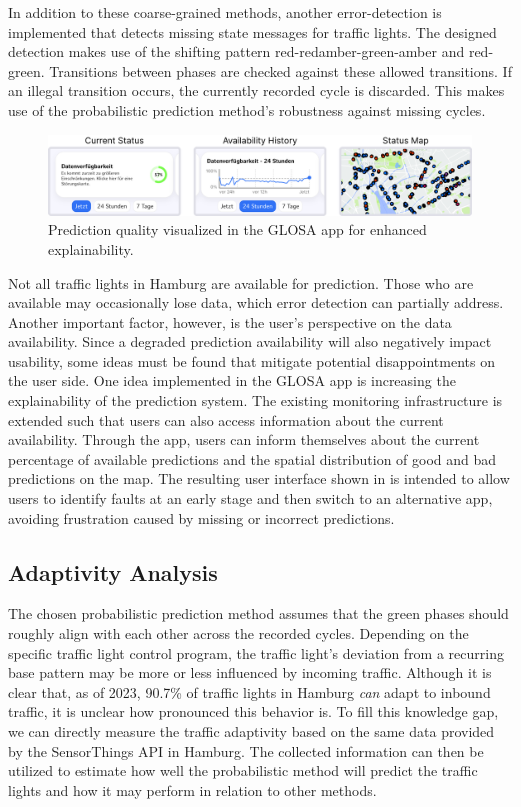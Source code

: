 In addition to these coarse-grained methods, another error-detection is implemented that detects missing state messages for traffic lights. The designed detection makes use of the shifting pattern red-redamber-green-amber and red-green. Transitions between phases are checked against these allowed transitions. If an illegal transition occurs, the currently recorded cycle is discarded. This makes use of the probabilistic prediction method's robustness against missing cycles.

\begin{figure}[htbp]
\centering
\includegraphics[width=\linewidth]{images/home-view-prediction-quality.png}
\caption{Prediction quality visualized in the GLOSA app for enhanced explainability.}
\label{fig:home-view-prediction-quality}
\end{figure}

Not all traffic lights in Hamburg are available for prediction. Those who are available may occasionally lose data, which error detection can partially address. Another important factor, however, is the user's perspective on the data availability. Since a degraded prediction availability will also negatively impact usability, some ideas must be found that mitigate potential disappointments on the user side. One idea implemented in the GLOSA app is increasing the explainability of the prediction system. The existing monitoring infrastructure is extended such that users can also access information about the current availability. Through the app, users can inform themselves about the current percentage of available predictions and the spatial distribution of good and bad predictions on the map. The resulting user interface shown in  is intended to allow users to identify faults at an early stage and then switch to an alternative app, avoiding frustration caused by missing or incorrect predictions.

\subsection{Adaptivity Analysis} 

The chosen probabilistic prediction method assumes that the green phases should roughly align with each other across the recorded cycles. Depending on the specific traffic light control program, the traffic light's deviation from a recurring base pattern may be more or less influenced by incoming traffic. Although it is clear that, as of 2023, 90.7\% of traffic lights in Hamburg \textit{can} adapt to inbound traffic, it is unclear how pronounced this behavior is. To fill this knowledge gap, we can directly measure the traffic adaptivity based on the same data provided by the SensorThings API in Hamburg. The collected information can then be utilized to estimate how well the probabilistic method will predict the traffic lights and how it may perform in relation to other methods.

